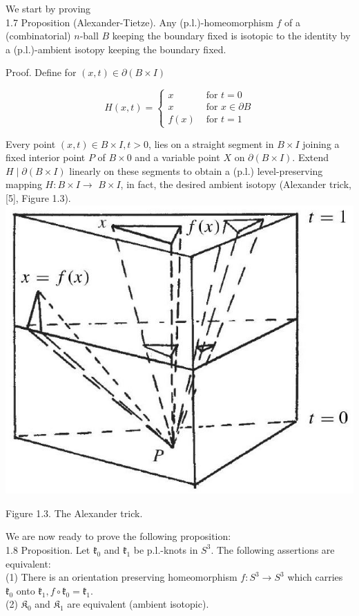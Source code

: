 \documentclass[10pt, letterpaper]{article}
\begin{document}
We start by proving\\
1.7 Proposition (Alexander-Tietze). Any (p.l.)-homeomorphism $f$ of a (combinatorial) $n$-ball $B$ keeping the boundary fixed is isotopic to the identity by a (p.l.)-ambient isotopy keeping the boundary fixed.

Proof. Define for $(x, t) \in \partial(B \times I)$

$$
H(x, t)= \begin{cases}x & \text { for } t=0 \\ x & \text { for } x \in \partial B \\ f(x) & \text { for } t=1\end{cases}
$$

Every point $(x, t) \in B \times I, t>0$, lies on a straight segment in $B \times I$ joining a fixed interior point $P$ of $B \times 0$ and a variable point $X$ on $\partial(B \times I)$. Extend $H \mid \partial(B \times I)$ linearly on these segments to obtain a (p.l.) level-preserving mapping $H: B \times I \rightarrow$ $B \times I$, in fact, the desired ambient isotopy (Alexander trick, [5], Figure 1.3).\\
\includegraphics[scale=0.2, center]{2025_05_21_9c06be8de7a55410f8c1g-019}

Figure 1.3. The Alexander trick.

We are now ready to prove the following proposition:\\
1.8 Proposition. Let $\mathfrak{k}_{0}$ and $\mathfrak{k}_{1}$ be p.l.-knots in $S^{3}$. The following assertions are equivalent:\\
(1) There is an orientation preserving homeomorphism $f: S^{3} \rightarrow S^{3}$ which carries $\mathfrak{k}_{0}$ onto $\mathfrak{k}_{1}, f \circ \mathfrak{k}_{0}=\mathfrak{k}_{1}$.\\
(2) $\mathfrak{K}_{0}$ and $\mathfrak{K}_{1}$ are equivalent (ambient isotopic).
\end{document}
